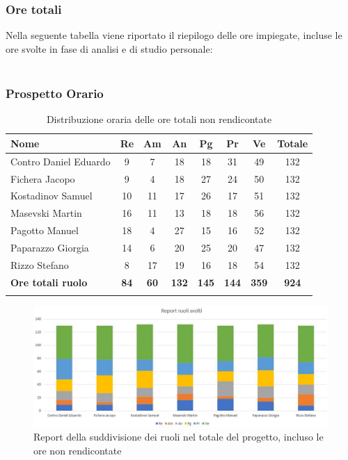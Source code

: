 \documentclass[../piano_di_progetto.tex]{subfiles}
\begin{document}
\subsubsection{Ore totali}
Nella seguente tabella viene riportato il riepilogo delle ore impiegate, incluse le ore svolte in fase di analisi e di studio personale: \\ \\
\subsubsection{Prospetto Orario}

\begin{center}
	\begin{longtable}{|l|c|c|c|c|c|c|c|}
		\hline
		\rowcolor{lightgray}
		\textbf{Nome} & \textbf{Re} & \textbf{Am} & \textbf{An} & \textbf{Pg}  & \textbf{Pr}   & \textbf{Ve} & \textbf{Totale} \\

		\hline
			Contro Daniel Eduardo & 9 & 7 & 18 & 18 & 31 & 49 & 132 \\
			Fichera Jacopo & 9 & 4 & 18 & 27 & 24 & 50 & 132 \\
			Kostadinov Samuel & 10 & 11 & 17 & 26 & 17 & 51 & 132 \\
			Masevski Martin & 16 & 11 & 13 & 18 & 18 & 56 & 132 \\
			Pagotto Manuel & 18 & 4 & 27 & 15 & 16 & 52 & 132 \\			
			Paparazzo Giorgia & 14 & 6 & 20 & 25 & 20 & 47 & 132 \\
			Rizzo Stefano & 8 & 17 & 19 & 16 & 18 & 54 & 132 \\
			\hline
			\textbf{Ore totali ruolo} & \textbf{84} & \textbf{60} & \textbf{132} & \textbf{145} & \textbf{144} & \textbf{359} & \textbf{924} \\
		\hline	
		\rowcolor{white}
		\caption{Distribuzione oraria delle ore totali non rendicontate}
	\end{longtable}
\end{center}

\begin{figure}[H]
\centering
\includegraphics[width=12cm]{src/img/report/report_ruoli_tot}
\caption{Report della suddivisione dei ruoli nel totale del progetto, incluso le ore non rendicontate}
\end{figure}
\end{document}
